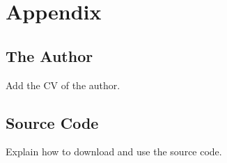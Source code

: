 
\chapter{Appendix}
	\label{chapter:appendix}

	\section{The Author}
		\label{sec:appendix:author}
		Add the CV of the author.


	\clearpage
	\section{Source Code}
		\label{sec:appendix:source}
		Explain how to download and use the source code.


	\let\chapter\section

	\clearpage
	
	

	\clearpage
	\listoffigures
	\listoftables

	\makeatletter
	\section{\listalgorithmcfname}
	\@mkboth{\MakeUppercase\listalgorithmcfname}{\MakeUppercase\listalgorithmcfname}
	\makeatother

	\clearpage
	\printglossary

	\makeatletter
	\if@todonotes@disabled%
	\else
		\section{\@todonotes@todolistname}
	\fi
	\makeatother
